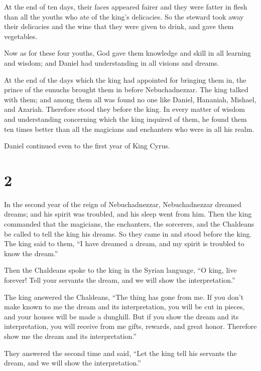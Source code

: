  At the end of ten days, their faces appeared fairer and
they were fatter in flesh than all the youths who ate of the king's
delicacies.  So the steward took away their delicacies
and the wine that they were given to drink, and gave them vegetables.

 Now as for these four youths, God gave them knowledge
and skill in all learning and wisdom; and Daniel had understanding in
all visions and dreams.

 At the end of the days which the king had appointed for
bringing them in, the prince of the eunuchs brought them in before
Nebuchadnezzar.  The king talked with them; and among
them all was found no one like Daniel, Hananiah, Mishael, and Azariah.
Therefore stood they before the king.  In every matter of
wisdom and understanding concerning which the king inquired of them, he
found them ten times better than all the magicians and enchanters who
were in all his realm.

 Daniel continued even to the first year of King Cyrus.

\hypertarget{section-1}{%
\section{2}\label{section-1}}

 In the second year of the reign of Nebuchadnezzar,
Nebuchadnezzar dreamed dreams; and his spirit was troubled, and his
sleep went from him.  Then the king commanded that the
magicians, the enchanters, the sorcerers, and the Chaldeans be called to
tell the king his dreams. So they came in and stood before the king.
 The king said to them, ``I have dreamed a dream, and my
spirit is troubled to know the dream.''

 Then the Chaldeans spoke to the king in the Syrian
language, ``O king, live forever! Tell your servants the dream, and we
will show the interpretation.''

 The king answered the Chaldeans, ``The thing has gone
from me. If you don't make known to me the dream and its interpretation,
you will be cut in pieces, and your houses will be made a dunghill.
 But if you show the dream and its interpretation, you
will receive from me gifts, rewards, and great honor. Therefore show me
the dream and its interpretation.''

 They answered the second time and said, ``Let the king
tell his servants the dream, and we will show the interpretation.''

